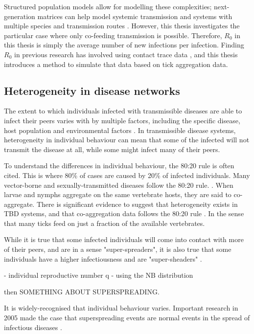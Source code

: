\documentclass{article}
\begin{document}
Structured population models allow for modelling these complexities; next-generation matrices can help model systemic transmission and systems with multiple species and transmission routes \cite{Diekman2000}. However, this thesis investigates the particular case where only co-feeding transmission is possible. Therefore, $ R_0 $ in this thesis is simply the average number of new infections per infection. Finding $ R_0 $ in previous research has involved using contact trace data \cite{LloydSmith2005}, and this thesis introduces a method to simulate that data based on tick aggregation data.

\subsection{Heterogeneity in disease networks}

The extent to which individuals infected with transmissible diseases are able to infect their peers varies with by multiple factors, including the specific disease, host population and environmental factors \cite{LloydSmith2005}. In transmissible disease systems, heterogeneity in individual behaviour can mean that some of the infected will not transmit the disease at all, while some might infect many of their peers. 

To understand the differences in individual behaviour, the 80:20 rule is often cited. This is where 80\% of cases are caused by 20\% of infected individuals. Many vector-borne and sexually-transmitted diseases follow the 80:20 rule. \cite{Woolhouse1997}. When larvae and nymphs aggregate on the same vertebrate hosts, they are said to co-aggregate. There is significant evidence to suggest that heterogeneity exists in TBD systems, and that co-aggregation data follows the 80:20 rule \cite{Ferreri2014, Brunner2008, HARRISON2012, JohnstoneRobertson2020}. In the sense that many ticks feed on just a fraction of the available vertebrates. 

While it is true that some infected individuals will come into contact with more of their peers, and are in a sense "super-spreaders", it is also true that some individuals have a higher infectiousness and are "super-sheaders" \cite{VanderWaal_2016}.

- individual reproductive number
q
- using the NB distribution

 then SOMETHING ABOUT SUPERSPREADING.



It is widely-recognised that individual behaviour varies. Important research in 2005 made the case that superspreading events are normal events in the spread of infectious diseases \cite{LloydSmith2005}. 
\end{document}
